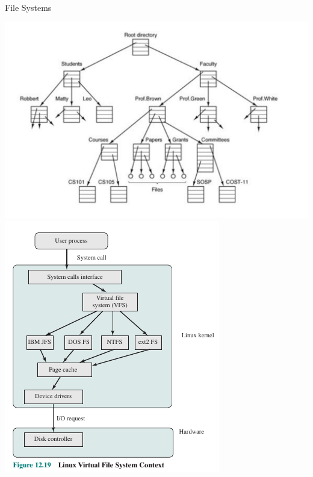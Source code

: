 \documentclass[10pt]{beamer}
\begin{document}
\begin{frame}[allowframebreaks]{File Systems}
   \begin{center}
      \includegraphics[keepaspectratio, width=\textwidth, height=\textheight-2\baselineskip-2\baselineskip]{img/031_filesys.png} \\ \framebreak
      \includegraphics[keepaspectratio, width=\textwidth, height=\textheight-2\baselineskip-2\baselineskip]{img/031_fs_linux.png} \\
 \end{center}
\end{frame}
\end{document}
